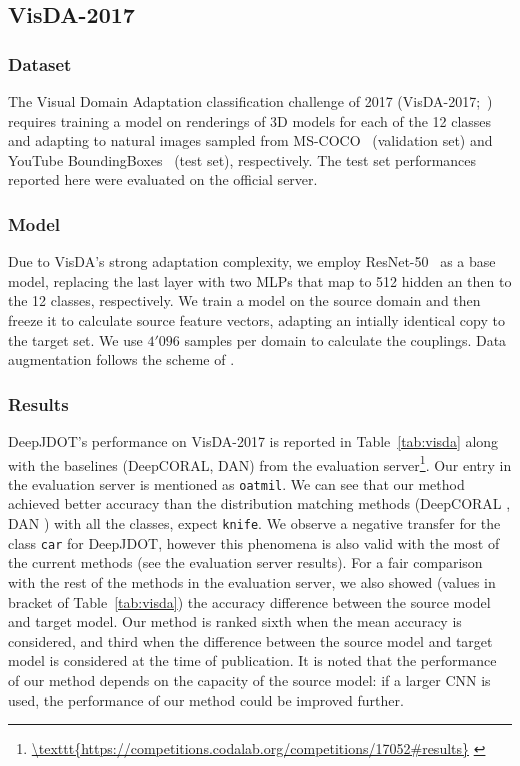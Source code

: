 \documentclass[runningheads]{llncs}
\begin{document}
\subsection{VisDA-2017}\label{sec:visda}

\subsubsection*{Dataset} The Visual Domain Adaptation classification challenge of 2017 (VisDA-2017;~\cite{visda2017}) requires training a model on renderings of 3D models for each of the 12 classes and adapting to natural images sampled from MS-COCO~\cite{lin2014microsoft} (validation set) and YouTube BoundingBoxes~\cite{real2017youtube} (test set), respectively. The test set performances reported here were evaluated on the official server.

\subsubsection*{Model} Due to VisDA's strong adaptation complexity, we employ ResNet-50~\cite{he2016deep} as a base model, replacing the last layer with two MLPs that map to 512 hidden an then to the 12 classes, respectively. We train a model on the source domain and then freeze it to calculate source feature vectors, adapting an intially identical copy to the target set. We use $4'096$ samples per domain to calculate the couplings. Data augmentation follows the scheme of \cite{french2018}.

 
\subsubsection*{Results} DeepJDOT's performance on VisDA-2017 is reported in Table~\ref{tab:visda} along with the baselines (DeepCORAL, DAN) from the evaluation server{\footnote{\url{\texttt{https://competitions.codalab.org/competitions/17052\#results}} \label{ft:eval_url}}}. Our entry in the evaluation server is mentioned as \texttt{oatmil}. 
We can see that our method achieved better accuracy than the distribution matching methods (DeepCORAL \cite{deepcoral}, DAN \cite{long15}) with all the classes, expect \texttt{knife}. We observe a negative transfer for the class \texttt{car} for DeepJDOT, however this phenomena is also valid with the most of the current methods (see the evaluation server results).
For a fair comparison with the rest of the methods in the evaluation server, we also showed (values in bracket of Table~\ref{tab:visda}) the accuracy difference between the source model and target model. Our method is ranked sixth when the mean accuracy is considered, and third when the difference between the source model and target model is considered at the time of publication. It is noted that the performance of our method depends on the capacity of the source model: if a larger CNN is used, the performance of our method could be improved further.
\end{document}
